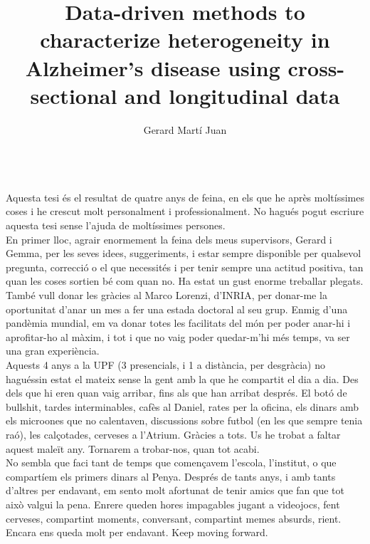\documentclass[12pt, b5paper,twoside]{tesi_upf}
\title{Data-driven methods to characterize heterogeneity in Alzheimer’s disease using cross-sectional and longitudinal data}
\subtitle{}
\author{Gerard Martí Juan}
\begin{document}
\frontmatter
\maketitle

\cleardoublepage





 \\
Aquesta tesi és el resultat de quatre anys de feina, en els que he après moltíssimes coses i he crescut molt personalment i professionalment. No hagués pogut escriure aquesta tesi sense l'ajuda de moltíssimes persones. \\

En primer lloc, agrair enormement la feina dels meus supervisors, Gerard i Gemma, per les seves idees, suggeriments, i estar sempre disponible per qualsevol pregunta, correcció o el que necessités i per tenir sempre una actitud positiva, tan quan les coses sortien bé com quan no. Ha estat un gust enorme treballar plegats. \\

També vull donar les gràcies al Marco Lorenzi, d'INRIA, per donar-me la oportunitat d'anar un mes a fer una estada doctoral al seu grup. Enmig d'una pandèmia mundial, em va donar totes les facilitats del món per poder anar-hi i aprofitar-ho al màxim, i tot i que no vaig poder quedar-m'hi més temps, va ser una gran experiència. \\

Aquests 4 anys a la UPF (3 presencials, i 1 a distància, per desgràcia) no haguéssin estat el mateix sense la gent amb la que he compartit el dia a dia. Des dels que hi eren quan vaig arribar, fins als que han arribat després. El botó de bullshit, tardes interminables, cafès al Daniel, rates per la oficina, els dinars amb els microones que no calentaven, discussions sobre futbol (en les que sempre tenia raó), les calçotades, cerveses a l'Atrium. Gràcies a tots. Us he trobat a faltar aquest maleït any. Tornarem a trobar-nos, quan tot acabi. \\

No sembla que faci tant de temps que començavem l'escola, l'institut, o que compartíem els primers dinars al Penya. Després de tants anys, i amb tants d'altres per endavant, em sento molt afortunat de tenir amics que fan que tot això valgui la pena. Enrere queden hores impagables jugant a videojocs, fent cerveses, compartint moments, conversant, compartint memes absurds, rient. Encara ens queda molt per endavant. Keep moving forward. \\
\end{document}

